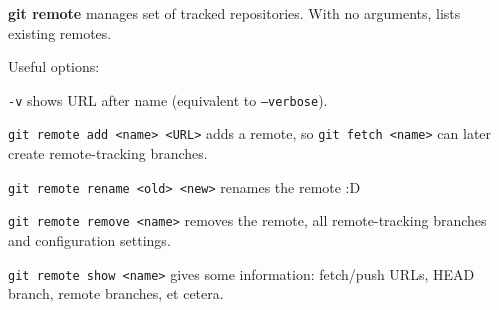 %

\textbf{git remote} manages set of tracked repositories.
With no arguments, lists existing remotes.

Useful options:
\begin{compactenum}
\item [\texttt{-v}] shows URL after name (equivalent to \texttt{--verbose}).
\end{compactenum}

\texttt{git remote add <name> <URL>} adds a remote, so \texttt{git fetch <name>} can later create remote-tracking branches.

\texttt{git remote rename <old> <new>} renames the remote :D

\texttt{git remote remove <name>} removes the remote, all remote-tracking branches and configuration settings.

\texttt{git remote show <name>} gives some information: fetch/push URLs, HEAD branch, remote branches, et cetera.

%